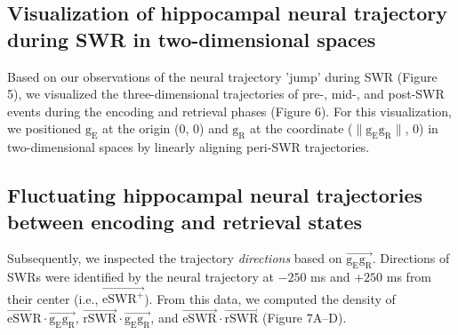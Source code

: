 \documentclass[final,3p,times,twocolumn]{elsarticle}
\begin{document}
\subsection{Visualization of hippocampal neural trajectory during SWR in two-dimensional spaces}
Based on our observations of the neural trajectory 'jump' during SWR (Figure 5), we visualized the three-dimensional trajectories of pre-, mid-, and post-SWR events during the encoding and retrieval phases (Figure 6). For this visualization, we positioned $\mathrm{g_{E}}$ at the origin (0, 0) and $\mathrm{g_{R}}$ at the coordinate ($\mathrm{\lVert g_{E}g_{R} \rVert}$, 0) in two-dimensional spaces by linearly aligning peri-SWR trajectories. 

\subsection{Fluctuating hippocampal neural trajectories between encoding and retrieval states}
Subsequently, we inspected the trajectory \textit{directions} based on $\overrightarrow{\mathrm{g_{E}g_{R}}}$. Directions of SWRs were identified by the neural trajectory at $-250$ ms and $+250$ ms from their center (i.e., $\overrightarrow{\mathrm{eSWR^+}}$). From this data, we computed the density of $\overrightarrow{\mathrm{eSWR}} \cdot \overrightarrow{\mathrm{g_{E}g_{R}}}$, $\overrightarrow{\mathrm{rSWR}} \cdot \overrightarrow{\mathrm{g_{E}g_{R}}}$, and $\overrightarrow{\mathrm{eSWR}} \cdot \overrightarrow{\mathrm{rSWR}}$ (Figure 7A--D).
\end{document}
